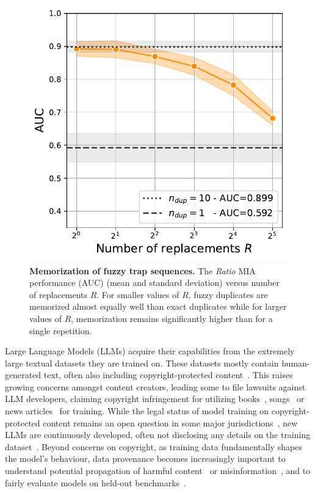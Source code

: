 \begin{figure}[t]
\centering
\includegraphics[width=0.8\linewidth]{figures/AUC_vs_R_main.pdf} 
    \caption{\textbf{Memorization of fuzzy trap sequences.} The \textit{Ratio} MIA performance (AUC) (mean and standard deviation) versus number of replacements $R$. For smaller values of $R$, fuzzy duplicates are memorized almost equally well than exact duplicates while for larger values of $R$, memorization remains significantly higher than for a single repetition.} 
\label{fig:auc_vs_r_main}
\end{figure} 

Large Language Models (LLMs) acquire their capabilities from the extremely large textual datasets they are trained on. These datasets mostly contain human-generated text, often also including copyright-protected content~\cite{atlantic,wired}. This raises growing concerns amongst content creators, leading some to file lawsuits against LLM developers, claiming copyright infringement for utilizing books~\cite{authorsguild,silvermanmeta}, songs~\cite{anthropic} or news articles~\cite{nytimes} for training. While the legal status of model training on copyright-protected content remains an open question in some major jurisdictions~\cite{samuelson2023generative}, new LLMs are continuously developed, often not disclosing any details on the training dataset~\cite{bommasani2023foundation,gpt4techreport,touvron2023llama2,jiang2024mixtral}. Beyond concerns on copyright, as training data fundamentally shapes the model's behaviour, data provenance becomes increasingly important to understand potential propagation of harmful content~\cite{solaiman2021process,bender2021dangers} or misinformation~\cite{zhang2023siren,barnard2023self}, and to fairly evaluate models on held-out benchmarks~\cite{magar2022data,sainz2023did,schaeffer2023pretraining}.

